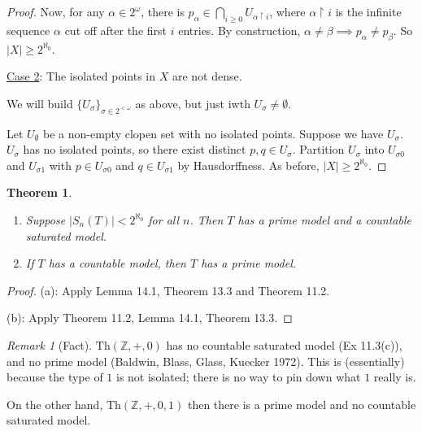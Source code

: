 \documentclass[]{article}
\theoremstyle{custhm}
\newtheorem{theorem}{Theorem}[section]
\theoremstyle{cusdef}
\theoremstyle{custhm}
\theoremstyle{custhm}
\theoremstyle{custhm}
\theoremstyle{ex}
\theoremstyle{custhm}
\theoremstyle{cusdef}
\theoremstyle{remark}
\newtheorem*{remark*}{Remark}
\theoremstyle{remark}
\theoremstyle{numremark}
\newcommand{\Z}{\mathbb{Z}}
\newcommand{\Th}{\textrm{Th}}
\begin{document}
\begin{proof}
	Now, for any $\alpha \in 2^\omega$, there is $p_\alpha \in \bigcap_{i\ge 0}U_{\alpha\upharpoonright i}$, where $\alpha \upharpoonright i$ is the infinite sequence $\alpha$ cut off after the first $i$ entries. By construction, $\alpha \ne \beta\implies p_\alpha \ne p_\beta$. So $|X|\ge 2^{\aleph_0}$.

	\underline{Case 2}: The isolated points in $X$ are not dense.

	We will build $\{U_\sigma\}_{\sigma \in 2^{<\omega}}$ as above, but just iwth $U_\sigma \ne \emptyset$.

	Let $U_\emptyset$ be a non-empty clopen set with no isolated points. Suppose we have $U_\sigma$. $U_\sigma$ has no isolated points, so there exist distinct $p,q \in U_\sigma$. Partition $U_\sigma$ into $U_{\sigma 0}$ and $U_{\sigma 1}$ with $p \in U_{\sigma 0}$ and $q \in U_{\sigma 1}$ by Hausdorffness. As before, $|X|\ge 2^{\aleph_0}$.
\end{proof}

\begin{theorem}\ 
	\begin{enumerate}[label=\alph*)]
		\item Suppose $|S_n(T)|<2^{\aleph_0}$ for all $n$. Then $T$ has a prime model and a countable saturated model.
		\item If $T$ has a countable model, then $T$ has a prime model.
	\end{enumerate}
\end{theorem}
\begin{proof} (a): Apply Lemma 14.1, Theorem 13.3 and Theorem 11.2.

	(b): Apply Theorem 11.2, Lemma 14.1, Theorem 13.3.
\end{proof}

\begin{remark*}[Fact]
$\Th(\Z,+,0)$ has no countable saturated model (Ex 11.3(c)), and no prime model (Baldwin, Blass, Glass, Kuecker 1972). This is (essentially) because the type of $1$ is not isolated; there is no way to pin down what $1$ really is.

On the other hand, $\Th(\Z,+,0,1)$ then there is a prime model and no countable saturated model.
\end{remark*}
\end{document}
